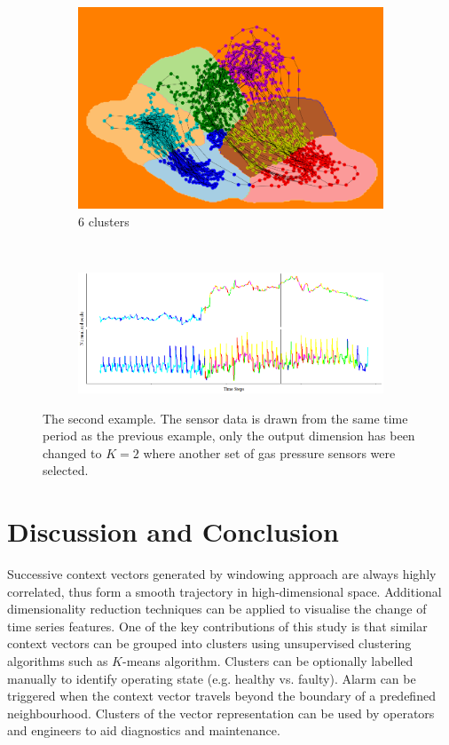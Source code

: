 \documentclass[runningheads]{llncs}
\begin{document}
\begin{figure}[H]
	\begin{subfigure}[b]{0.35\textwidth}
		\includegraphics[width=\textwidth]{ex2_pca_cluster_6.png}
		\caption{\(6\) clusters}
		\label{fig:ex2_pca_cluster_6}
	\end{subfigure}
	~
	\begin{subfigure}[b]{0.6\textwidth}
		\includegraphics[width=\textwidth]{ex2_context_timeline_6.png}
		\label{fig:ex2_context_timeline_6}
	\end{subfigure}
	
	\caption{The second example. The sensor data is drawn from the same time period as the previous example, only the output dimension has been changed to \(K=2\) where another set of gas pressure sensors were selected. }
	\label{fig:ex2_pca_cluster}
\end{figure}


\section{Discussion and Conclusion}

Successive context vectors generated by windowing approach are always highly correlated, thus form a smooth trajectory in high-dimensional space. Additional dimensionality reduction techniques can be applied to visualise the change of time series features. One of the key contributions of this study is that similar context vectors can be grouped into clusters using unsupervised clustering algorithms such as \(K\)-means algorithm. Clusters can be optionally labelled manually to identify operating state (e.g. healthy vs. faulty). Alarm can be triggered when the context vector travels beyond the boundary of a predefined neighbourhood. Clusters of the vector representation can be used by operators and engineers to aid diagnostics and maintenance.
\end{document}
